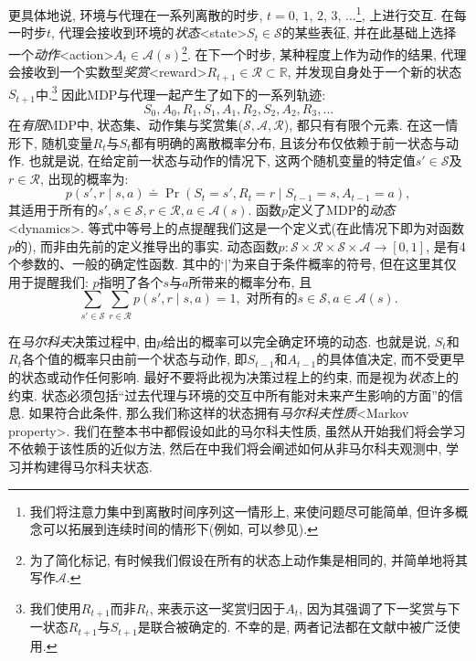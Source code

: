 更具体地说, 环境与代理在一系列离散的时步, $t = 0$, $1$, $2$, $3$, $\dots$\footnote{我们将注意力集中到离散时间序列这一情形上, 来使问题尽可能简单, 但许多概念可以拓展到连续时间的情形下(例如, 可以参见\cite{Bertsekas1996, Doya1996}).}, 上进行交互. 在每一时步$t$, 代理会接收到环境的\emph{状态}<state>$S_t \in \mathcal{S}$的某些表征, 并在此基础上选择一个\emph{动作}<action>$A_t \in \mathcal{A}(s)$\footnote{为了简化标记, 有时候我们假设在所有的状态上动作集是相同的, 并简单地将其写作$\mathcal{A}$.}. 在下一个时步, 某种程度上作为动作的结果, 代理会接收到一个实数型\emph{奖赏}<reward>$R_{t + 1} \in \mathcal{R} \subset \mathbb{R}$, 并发现自身处于一个新的状态$S_{t + 1}$中.\footnote{我们使用$R_{t + 1}$而非$R_t​$, 来表示这一奖赏归因于$A_t​$, 因为其强调了下一奖赏与下一状态$R_{t + 1}​$与$S_{t + 1}​$是联合被确定的. 不幸的是, 两者记法都在文献中被广泛使用.} 因此MDP与代理一起产生了如下的一系列轨迹:
\begin{equation}\label{eq:3.1}
S_0, A_0, R_1, S_1, A_1, R_2, S_2, A_2, R_3, \dots
\end{equation}
在\emph{有限}MDP中, 状态集、动作集与奖赏集($\mathcal{S}, \mathcal{A}, \mathcal{R}$), 都只有有限个元素. 在这一情形下, 随机变量$R_t$与$S_t$都有明确的离散概率分布, 且该分布仅依赖于前一状态与动作. 也就是说, 在给定前一状态与动作的情况下, 这两个随机变量的特定值$s' \in \mathcal{S}$及$r \in \mathcal{R}$, 出现的概率为:
\begin{equation}\label{eq:3.2}
p(s', r \mid s, a) \doteq \Pr (S_t = s', R_t = r \mid S_{t - 1} = s, A_{t - 1} = a),
\end{equation}
其适用于所有的$s', s \in \mathcal{S}, r \in \mathcal{R}, a \in \mathcal{A}(s)$. 函数$p$定义了MDP的\emph{动态}<dynamics>. 等式中等号上的点提醒我们这是一个定义式(在此情况下即为对函数$p$的), 而非由先前的定义推导出的事实. 动态函数$p : \mathcal{S} \times \mathcal{R} \times \mathcal{S} \times \mathcal{A} \rightarrow [0, 1]$, 是有4个参数的、一般的确定性函数. 其中的`$\mid$'为来自于条件概率的符号, 但在这里其仅用于提醒我们: $p$指明了各个$s$与$a$所带来的概率分布, 且
\begin{equation}\label{eq:3.3}
\sum_{s' \in \mathcal{S}} \sum_{r \in \mathcal{R}} p(s', r \mid s, a) = 1, \text{ 对所有的}s \in \mathcal{S}, a \in \mathcal{A}(s).
\end{equation}

在\emph{马尔科夫}决策过程中, 由$p$给出的概率可以完全确定环境的动态. 也就是说, $S_t$和$R_t$各个值的概率只由前一个状态与动作, 即$S_{t - 1}$和$A_{t - 1}$的具体值决定, 而不受更早的状态或动作任何影响. 最好不要将此视为决策过程上的约束, 而是视为\emph{状态}上的约束. 状态必须包括``过去代理与环境的交互中所有能对未来产生影响的方面''的信息. 如果符合此条件, 那么我们称这样的状态拥有\emph{马尔科夫性质}<Markov property>. 我们在整本书中都假设如此的马尔科夫性质, 虽然从开始我们将会学习不依赖于该性质的近似方法, 然后在中我们将会阐述如何从非马尔科夫观测中, 学习并构建得马尔科夫状态.

